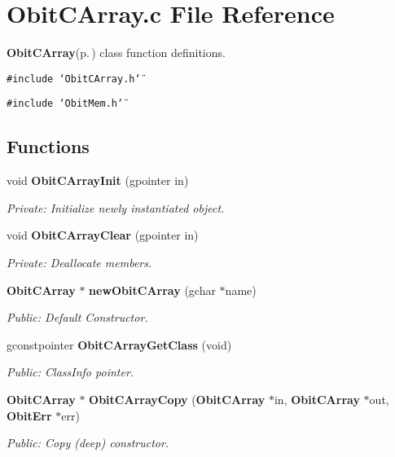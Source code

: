 \section{Obit\-CArray.c File Reference}
\label{ObitCArray_8c}
{\bf Obit\-CArray}{\rm (p.\,\pageref{structObitCArray})} class function definitions. 

{\tt \#include \char`\"{}Obit\-CArray.h\char`\"{}}\par
{\tt \#include \char`\"{}Obit\-Mem.h\char`\"{}}\par
\subsection*{Functions}
\begin{CompactItemize}
\item 
void {\bf Obit\-CArray\-Init} (gpointer in)
\begin{CompactList}\small\item\em Private: Initialize newly instantiated object. \item\end{CompactList}\item 
void {\bf Obit\-CArray\-Clear} (gpointer in)
\begin{CompactList}\small\item\em Private: Deallocate members. \item\end{CompactList}\item 
{\bf Obit\-CArray} $\ast$ {\bf new\-Obit\-CArray} (gchar $\ast$name)
\begin{CompactList}\small\item\em Public: Default Constructor. \item\end{CompactList}\item 
gconstpointer {\bf Obit\-CArray\-Get\-Class} (void)
\begin{CompactList}\small\item\em Public: Class\-Info pointer. \item\end{CompactList}\item 
{\bf Obit\-CArray} $\ast$ {\bf Obit\-CArray\-Copy} ({\bf Obit\-CArray} $\ast$in, {\bf Obit\-CArray} $\ast$out, {\bf Obit\-Err} $\ast$err)
\begin{CompactList}\small\item\em Public: Copy (deep) constructor. \item\end{CompactList}\item 

\end{CompactItemize}

